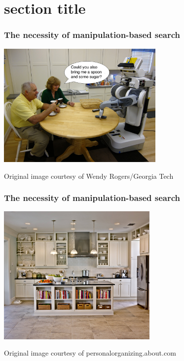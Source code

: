 \section{section title}
\begin{frame}
  \frametitle{The necessity of manipulation-based search}
  \begin{center}
    \includegraphics[width=3.2in]{img/robot_in_kitchen.jpg}

    \tiny{Original image courtesy of Wendy Rogers/Georgia Tech}
  \end{center}
\end{frame}

\begin{frame}
  \frametitle{The necessity of manipulation-based search}
  \begin{center}
    \includegraphics[height=2.7in]{img/kitchen-organization-fake.jpg}

    \tiny{Original image courtesy of personalorganizing.about.com}
  \end{center}
\end{frame}

